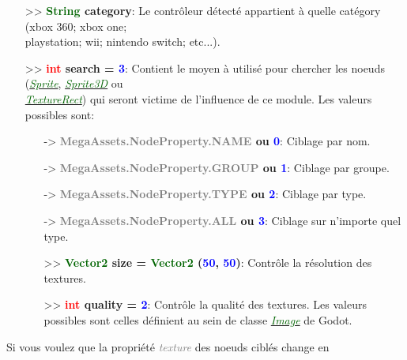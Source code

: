 \documentclass[a4paper, 11pt]{article}
\begin{document}
	\begin{itemize}
		\item[>> \textbf{\textcolor{darkgreen}{String} \hypertarget{cat}{category}}:] Le contrôleur détecté 
		appartient à quelle catégory (xbox 360; xbox one; \\playstation; wii; nintendo switch; etc...).\\
		\item[>> \textbf{\textcolor{red}{int} search = \textcolor{blue}{3}}:] Contient le moyen à utilisé 
		pour chercher les noeuds (\href{https://docs.godotengine.org/en/stable/classes/class_sprite.html}
		{\textit{\textcolor{darkgreen}{Sprite}}},
		\href{https://docs.godotengine.org/en/stable/classes/class_sprite3d.html}
		{\textit{\textcolor{darkgreen}{Sprite3D}}} ou
		\href{https://docs.godotengine.org/en/stable/classes/class_texturerect.html}
		{\textit{\textcolor{darkgreen}{\\TextureRect}}}) qui seront victime de l'influence de ce module. Les 
		valeurs possibles sont:
		\begin{itemize}
			\item[-> \textbf{\textcolor{gray}{MegaAssets.NodeProperty.NAME} ou \textcolor{blue}{0}}:] 
			Ciblage par nom.
			\item[-> \textbf{\textcolor{gray}{MegaAssets.NodeProperty.GROUP} ou \textcolor{blue}{1}}:] 
			Ciblage par groupe.
			\item[-> \textbf{\textcolor{gray}{MegaAssets.NodeProperty.TYPE} ou \textcolor{blue}{2}}:] 
			Ciblage par type.
			\item[-> \textbf{\textcolor{gray}{MegaAssets.NodeProperty.ALL} ou \textcolor{blue}{3}}:] Ciblage 
			sur n'importe quel type.\\
			\item[>> \textbf{\textcolor{darkgreen}{Vector2} size = \textcolor{darkgreen}{Vector2}
			(\textcolor{blue}{50}, \textcolor{blue}{50})}:] Contrôle la résolution des textures.\\
			\item[>> \textbf{\textcolor{red}{int} quality = \textcolor{blue}{2}}:] Contrôle la qualité des
			textures. Les valeurs possibles sont celles définient au sein de classe
			\href{https://docs.godotengine.org/en/stable/classes/class_image.html}
			{\textit{\textcolor{darkgreen}{Image}}} de Godot.\\
		\end{itemize}
	\end{itemize}
	\newpage Si vous voulez que la propriété \textit{\textcolor{gray}{texture}} des noeuds ciblés change en 
\end{document}
